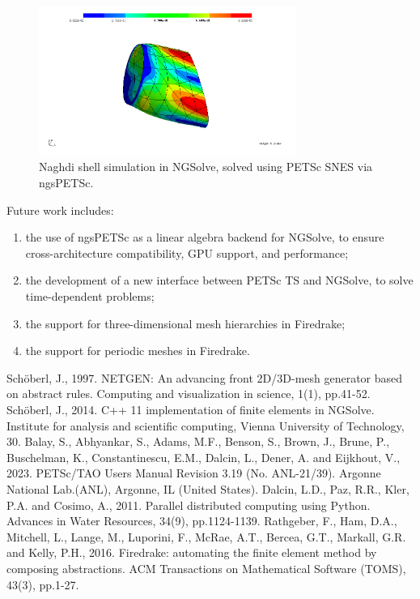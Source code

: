 \documentclass[a4paper,11pt]{article}
\begin{document}
\begin{figure}[h]
    \centering
    \includegraphics[width=0.75\textwidth]{../figures/naghdi.jpg}
    \caption{Naghdi shell simulation in NGSolve, solved using PETSc SNES via ngsPETSc.}
    \label{fig:ngsPETSc}
\end{figure}
Future work includes:
\begin{enumerate}
    \item the use of ngsPETSc as a linear algebra backend for NGSolve, to ensure cross-architecture compatibility, GPU support, and performance;
    \item the development of a new interface between PETSc TS and NGSolve, to solve time-dependent problems;
    \item the support for three-dimensional mesh hierarchies in Firedrake;
    \item the support for periodic meshes in Firedrake.
\end{enumerate}
\begin{thebibliography}{9.}
\frenchspacing
{}Schöberl, J., 1997. NETGEN: An advancing front 2D/3D-mesh generator based on abstract rules. Computing and visualization in science, 1(1), pp.41-52.
Schöberl, J., 2014. C++ 11 implementation of finite elements in NGSolve. Institute for analysis and scientific computing, Vienna University of Technology, 30.
Balay, S., Abhyankar, S., Adams, M.F., Benson, S., Brown, J., Brune, P., Buschelman, K., Constantinescu, E.M., Dalcin, L., Dener, A. and Eijkhout, V., 2023. PETSc/TAO Users Manual Revision 3.19 (No. ANL-21/39). Argonne National Lab.(ANL), Argonne, IL (United States).
Dalcin, L.D., Paz, R.R., Kler, P.A. and Cosimo, A., 2011. Parallel distributed computing using Python. Advances in Water Resources, 34(9), pp.1124-1139.
Rathgeber, F., Ham, D.A., Mitchell, L., Lange, M., Luporini, F., McRae, A.T., Bercea, G.T., Markall, G.R. and Kelly, P.H., 2016. Firedrake: automating the finite element method by composing abstractions. ACM Transactions on Mathematical Software (TOMS), 43(3), pp.1-27.
\end{thebibliography}

\end{document}
